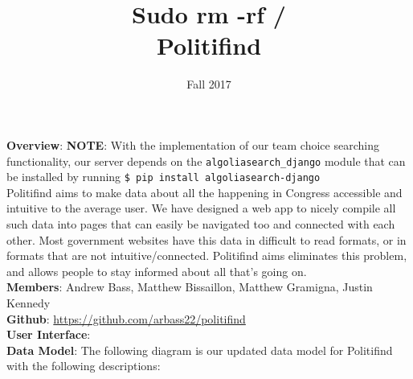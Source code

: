 \documentclass{article}
\newcommand{\n}{\noindent}
\begin{document}
\title{Sudo rm -rf / \\ \large{Politifind}}
\author{Fall 2017}
\date{}
\maketitle

\n\textbf{Overview}: \textbf{NOTE}: With the implementation of our team choice searching functionality, our server depends on the \verb|algoliasearch_django| module that can be installed by running \verb|$ pip install algoliasearch-django| \\

Politifind aims to make data about all the happening in Congress accessible and intuitive to the average user. We have designed a web app to nicely compile all such data into pages that can easily be navigated too and connected with each other. Most government websites have this data in difficult to read formats, or in formats that are not intuitive/connected. Politifind aims eliminates this problem, and allows people to stay informed about all that's going on. \\

\n\textbf{Members}: Andrew Bass, Matthew Bissaillon, Matthew Gramigna, Justin Kennedy \\

\n\textbf{Github}: \url{https://github.com/arbass22/politifind} \\

\n\textbf{User Interface}: \\

\n\textbf{Data Model}: The following diagram is our updated data model for Politifind with the following descriptions: \\ 
\end{document}
